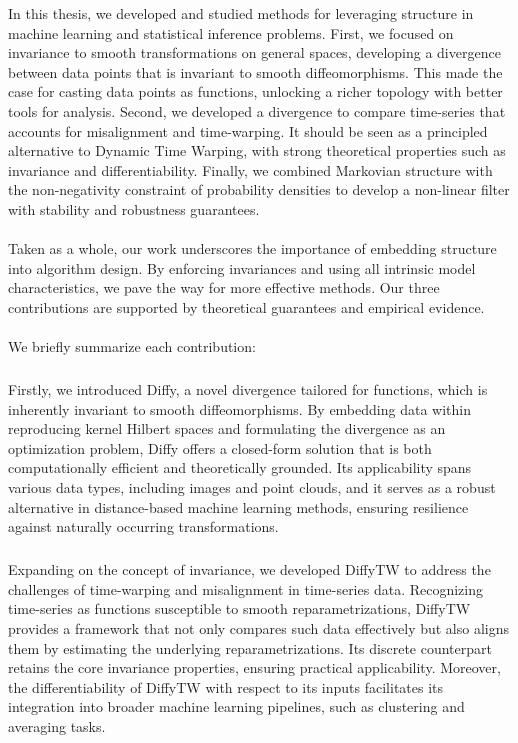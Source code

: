 
In this thesis, we developed and studied methods for leveraging structure in machine learning and statistical inference problems. First, we focused on invariance to smooth transformations on general spaces, developing a divergence between data points that is invariant to smooth diffeomorphisms. This made the case for casting data points as functions, unlocking a richer topology with better tools for analysis. Second, we developed a divergence to compare time-series that accounts for misalignment and time-warping. It should be seen as a principled alternative to Dynamic Time Warping, with strong theoretical properties such as invariance and differentiability. Finally, we combined Markovian structure with the non-negativity constraint of probability densities to develop a non-linear filter with stability and robustness guarantees.

\paragraph{}
Taken as a whole, our work underscores the importance of embedding structure into algorithm design. By enforcing invariances and using all intrinsic model characteristics, we pave the way for more effective methods. Our three contributions are supported by theoretical guarantees and empirical evidence.

\paragraph{}
\noindent We briefly summarize each contribution:

\subparagraph{} Firstly, we introduced Diffy, a novel divergence tailored for functions, which is inherently invariant to smooth diffeomorphisms. By embedding data within reproducing kernel Hilbert spaces and formulating the divergence as an optimization problem, Diffy offers a closed-form solution that is both computationally efficient and theoretically grounded. Its applicability spans various data types, including images and point clouds, and it serves as a robust alternative in distance-based machine learning methods, ensuring resilience against naturally occurring transformations.

\subparagraph{}Expanding on the concept of invariance, we developed DiffyTW to address the challenges of time-warping and misalignment in time-series data. Recognizing time-series as functions susceptible to smooth reparametrizations, DiffyTW provides a framework that not only compares such data effectively but also aligns them by estimating the underlying reparametrizations. Its discrete counterpart retains the core invariance properties, ensuring practical applicability. Moreover, the differentiability of DiffyTW with respect to its inputs facilitates its integration into broader machine learning pipelines, such as clustering and averaging tasks.


